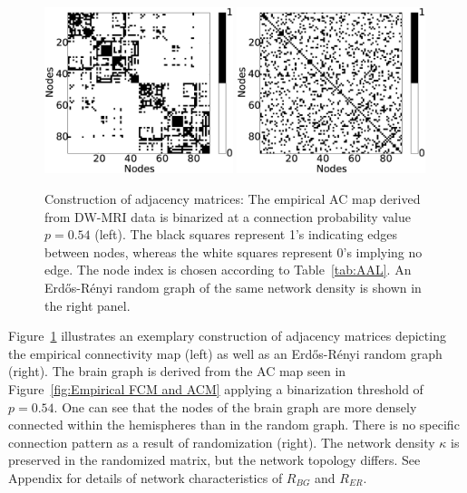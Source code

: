 \documentclass[fleqn,10pt]{wlpeerj}
\begin{document}
\begin{figure}[htpb]\centering
	\includegraphics[width=0.49\textwidth]{Figures/Adj_ACM}	 
	\includegraphics[width=0.49\textwidth]{Figures/Adj_ER} 
\caption{Construction of adjacency matrices: The empirical AC map derived from DW-MRI data is binarized at a
connection probability value $p=0.54$ (left). The black squares represent 1's indicating edges between nodes, whereas
the white squares represent 0's implying no edge. The node index is chosen according to Table~\ref{tab:AAL}. An
Erd\H{o}s-R\'{e}nyi random graph of the same network density is shown in the right panel.}
\label{fig:Binarizing via Thresholding}
\end{figure}

Figure~\ref{fig:Binarizing via Thresholding} illustrates an exemplary construction of adjacency matrices depicting the
empirical connectivity map (left) as well as an Erd\H{o}s-R\'{e}nyi random graph (right). The brain graph is derived
from the AC map seen in Figure~\ref{fig:Empirical FCM and ACM} applying a binarization threshold of $p=0.54$. One can
see
that the nodes of the brain graph are more densely connected within the hemispheres than in the random graph. There is
no specific connection pattern as a result of randomization (right). The network density $\kappa$ is preserved in
the randomized matrix, but the network topology differs. See Appendix for details of network characteristics of $R_{BG}$
and $R_{ER}$.
\end{document}
